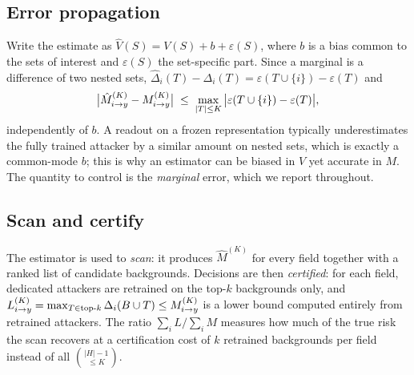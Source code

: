 \subsection{Error propagation}
Write the estimate as $\hat V(S)=V(S)+b+\varepsilon(S)$, where $b$ is a bias common to the sets
of interest and $\varepsilon(S)$ the set-specific part. Since a marginal is a difference of two
nested sets, $\hat\Delta_i(T)-\Delta_i(T)=\varepsilon(T\cup\{i\})-\varepsilon(T)$ and
\begin{equation}\label{eq:prop}
\big|\hat M^{(K)}_{i\to y} - M^{(K)}_{i \to y}\big| \;\le\; \max_{|T|\le K}\big|\varepsilon(T\cup\{i\})-\varepsilon(T)\big|,
\end{equation}
independently of $b$. A readout on a frozen representation typically underestimates the fully
trained attacker by a similar amount on nested sets, which is exactly a common-mode $b$; this is
why an estimator can be biased in $V$ yet accurate in $M$. The quantity to control is the
\emph{marginal} error, which we report throughout.

\subsection{Scan and certify}\label{sec:scan}
The estimator is used to \emph{scan}: it produces $\hat M^{(K)}$ for every field together with a
ranked list of candidate backgrounds. Decisions are then \emph{certified}: for each field,
dedicated attackers are retrained on the top-$k$ backgrounds only, and
$L^{(K)}_{i\to y}=\max_{T\in\text{top-}k}\Delta_i(B\cup T)\le M^{(K)}_{i \to y}$ is a lower bound computed
entirely from retrained attackers. The ratio $\sum_i L/\sum_i M$ measures how much of the true
risk the scan recovers at a certification cost of $k$ retrained backgrounds per field instead
of all $\binom{|H|-1}{\le K}$.
